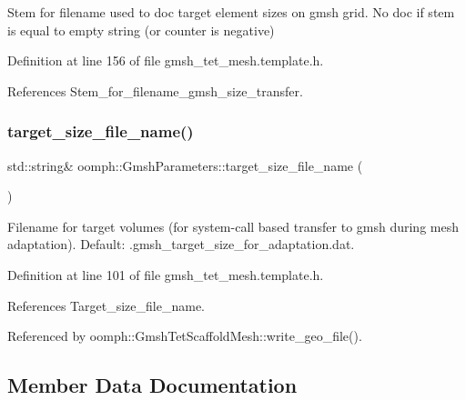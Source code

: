 Stem for filename used to doc target element sizes on gmsh grid. No doc if stem is equal to empty string (or counter is negative) 



Definition at line 156 of file gmsh\+\_\+tet\+\_\+mesh.\+template.\+h.



References Stem\+\_\+for\+\_\+filename\+\_\+gmsh\+\_\+size\+\_\+transfer.

\mbox{\label{classoomph_1_1GmshParameters_a89c7ff40c1dd70b20b0ae22d30fe5c8a}} 
\subsubsection{\texorpdfstring{target\+\_\+size\+\_\+file\+\_\+name()}{target\_size\_file\_name()}}
{\footnotesize\ttfamily std\+::string\& oomph\+::\+Gmsh\+Parameters\+::target\+\_\+size\+\_\+file\+\_\+name (\begin{DoxyParamCaption}{ }\end{DoxyParamCaption})\hspace{0.3cm}{\ttfamily [inline]}}



Filename for target volumes (for system-\/call based transfer to gmsh during mesh adaptation). Default\+: .gmsh\+\_\+target\+\_\+size\+\_\+for\+\_\+adaptation.\+dat. 



Definition at line 101 of file gmsh\+\_\+tet\+\_\+mesh.\+template.\+h.



References Target\+\_\+size\+\_\+file\+\_\+name.



Referenced by oomph\+::\+Gmsh\+Tet\+Scaffold\+Mesh\+::write\+\_\+geo\+\_\+file().



\subsection{Member Data Documentation}
\mbox{\label{classoomph_1_1GmshParameters_af6ca2a71d6aae3f8c51e9b4ad53b787a}} 
